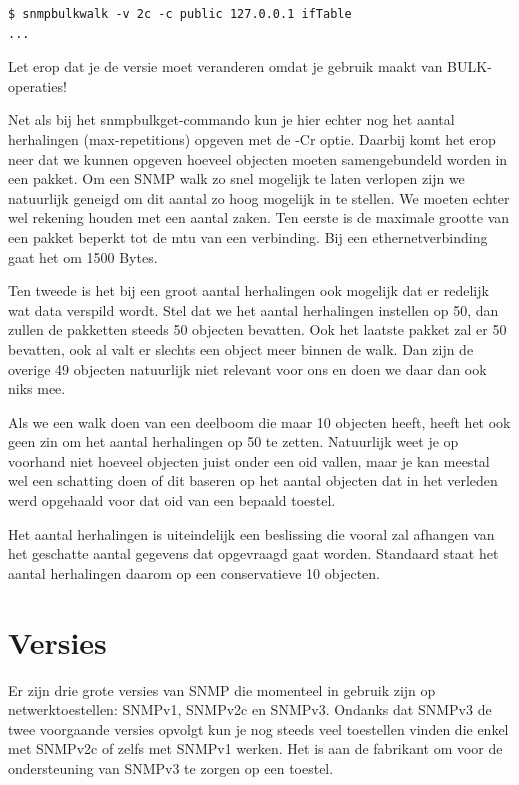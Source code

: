\begin{lstlisting}[caption={SNMP walkopdracht m.b.v. BULK-operaties}, label=netsnmp-bulkwalk]
$ snmpbulkwalk -v 2c -c public 127.0.0.1 ifTable
...
\end{lstlisting}

Let erop dat je de versie moet veranderen omdat je gebruik maakt van BULK-operaties!

Net als bij het snmpbulkget-commando kun je hier echter nog het aantal herhalingen (max-repetitions) opgeven met de -Cr optie.
Daarbij komt het erop neer dat we kunnen opgeven hoeveel objecten moeten samengebundeld worden in een pakket.
Om een SNMP walk zo snel mogelijk te laten verlopen zijn we natuurlijk geneigd om dit aantal zo hoog mogelijk in te stellen.
We moeten echter wel rekening houden met een aantal zaken.
Ten eerste is de maximale grootte van een pakket beperkt tot de \gls{mtu} van een verbinding.
Bij een ethernetverbinding gaat het om 1500 Bytes.

Ten tweede is het bij een groot aantal herhalingen ook mogelijk dat er redelijk wat data verspild wordt.
Stel dat we het aantal herhalingen instellen op 50, dan zullen de pakketten steeds 50 objecten bevatten.
Ook het laatste pakket zal er 50 bevatten, ook al valt er slechts een object meer binnen de walk.
Dan zijn de overige 49 objecten natuurlijk niet relevant voor ons en doen we daar dan ook niks mee.

Als we een walk doen van een deelboom die maar 10 objecten heeft, heeft het ook geen zin om het aantal herhalingen op 50 te zetten.
Natuurlijk weet je op voorhand niet hoeveel objecten juist onder een \gls{oid} vallen,
maar je kan meestal wel een schatting doen of dit baseren op het aantal objecten dat in het verleden werd opgehaald voor dat \gls{oid} van een bepaald toestel.

Het aantal herhalingen is uiteindelijk een beslissing die vooral zal afhangen van het geschatte aantal gegevens dat opgevraagd gaat worden.
Standaard staat het aantal herhalingen daarom op een conservatieve 10 objecten.


\section{Versies}
\label{snmp-versies}
Er zijn drie grote versies van SNMP die momenteel in gebruik zijn op netwerktoestellen: SNMPv1, SNMPv2c en SNMPv3.
Ondanks dat SNMPv3 de twee voorgaande versies opvolgt kun je nog steeds veel toestellen vinden die enkel met SNMPv2c of zelfs met SNMPv1 werken.
Het is aan de fabrikant om voor de ondersteuning van SNMPv3 te zorgen op een toestel.


